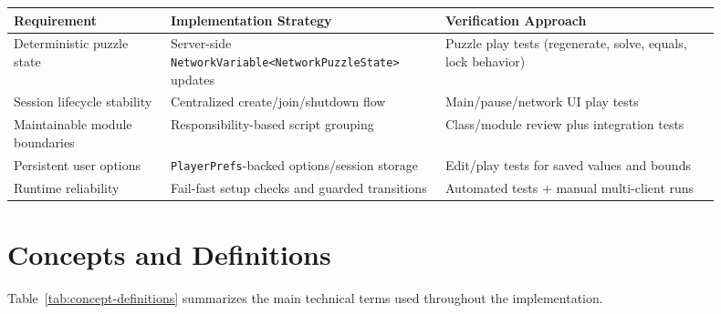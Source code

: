 \begin{table}[H]
\centering
\caption{Non-Functional Requirement Verification}
\label{tab:nonfunctional-verification}
\begin{longtable}{|>{\centering\arraybackslash}m{0.2\linewidth}|>{\centering\arraybackslash}m{0.35\linewidth}|>{\centering\arraybackslash}m{0.35\linewidth}|}
\hline
\hline
\textbf{Requirement} & \textbf{Implementation Strategy} & \textbf{Verification Approach} \\
\hline
Deterministic puzzle state & Server-side \texttt{NetworkVariable\allowbreak<NetworkPuzzleState>} updates & Puzzle play tests (regenerate, solve, equals, lock behavior) \\
\hline
Session lifecycle stability & Centralized create/join/shutdown flow & Main/pause/network UI play tests \\
\hline
Maintainable module boundaries & Responsibility-based script grouping & Class/module review plus integration tests \\
\hline
Persistent user options & \texttt{PlayerPrefs}-backed options/session storage & Edit/play tests for saved values and bounds \\
\hline
Runtime reliability & Fail-fast setup checks and guarded transitions & Automated tests + manual multi-client runs \\
\hline
\end{longtable}
\addtocounter{table}{-1}
\end{table}

\newpage

\section{Concepts and Definitions}
Table~\ref{tab:concept-definitions} summarizes the main technical terms used throughout the implementation.

